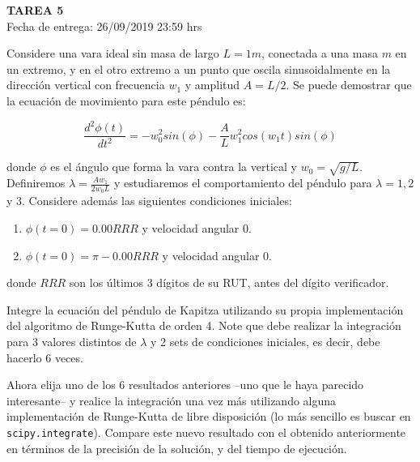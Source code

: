 \documentclass[letter, 11pt]{article}
\newcommand{\tareanro}{5}
\newcommand{\fechaentrega}{26/09/2019 23:59 hrs}
\begin{document}
\thispagestyle{firstpage}

\begin{center}
  {\uppercase{\LARGE \bf Tarea \tareanro}}\\
  Fecha de entrega: \fechaentrega
\end{center}



 Considere una vara ideal sin masa de
largo $L=1 m$, conectada a una masa $m$ en un extremo, y en el otro extremo a un
punto que oscila sinusoidalmente en la dirección vertical con frecuencia $w_1$ y
amplitud $A=L/2$. Se puede demostrar que la ecuación de movimiento para este
péndulo es:

$$ \frac{d^2 \phi(t)}{dt^2} =
          -w_0^2 sin(\phi) - \frac{A}{L}w_1^2 cos(w_1 t) sin(\phi) $$

\noindent donde $\phi$ es el ángulo que forma la vara contra la vertical y
$w_0=\sqrt{g/L}$. Definiremos $\lambda=\frac{A w_1}{2 w_0 L}$ y estudiaremos el
comportamiento del péndulo para $\lambda=1, 2$ y $3$. Considere además las
siguientes condiciones iniciales:

\begin{enumerate}
  \item $\phi(t=0) = 0.00RRR$ y velocidad angular $0$.
  \item $\phi(t=0) = \pi - 0.00RRR$ y velocidad angular $0$.
\end{enumerate}

\noindent donde $RRR$ son los últimos 3 dígitos de su RUT, antes del dígito
verificador.

Integre la ecuación del péndulo de Kapitza utilizando su propia implementación
del algoritmo de Runge-Kutta de orden 4. Note que debe realizar la integración
para 3 valores distintos de $\lambda$ y 2 sets de condiciones iniciales, es
decir, debe hacerlo 6 veces.

Ahora elija uno de los 6 resultados anteriores --uno que le haya parecido
interesante-- y realice la integración una vez más utilizando alguna
implementación de Runge-Kutta de libre disposición (lo más sencillo es buscar
en \texttt{scipy.integrate}). Compare este nuevo resultado con el obtenido
anteriormente en términos de la precisión de la solución, y del tiempo de
ejecución.


\end{document}
